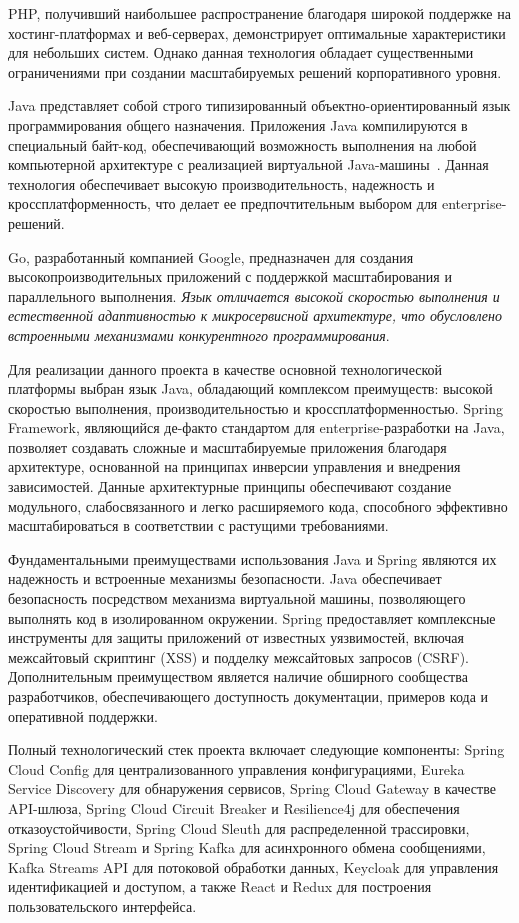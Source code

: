 PHP, получивший наибольшее распространение благодаря широкой поддержке на хостинг-платформах и веб-серверах, демонстрирует оптимальные характеристики для небольших систем. Однако данная технология обладает существенными ограничениями при создании масштабируемых решений корпоративного уровня.

Java представляет собой строго типизированный объектно-ориентированный язык программирования общего назначения.
Приложения Java компилируются в специальный байт-код, обеспечивающий возможность выполнения на любой компьютерной архитектуре с реализацией виртуальной Java-машины~\cite{12_schildt2019}. Данная технология обеспечивает высокую производительность, надежность и кроссплатформенность, что делает ее предпочтительным выбором для enterprise-решений.

Go, разработанный компанией Google, предназначен для создания высокопроизводительных приложений с поддержкой масштабирования и параллельного выполнения. \textit{Язык отличается высокой скоростью выполнения и естественной адаптивностью к микросервисной архитектуре, что обусловлено встроенными механизмами конкурентного программирования}.

Для реализации данного проекта в качестве основной технологической платформы выбран язык Java, обладающий комплексом преимуществ: высокой скоростью выполнения, производительностью и кроссплатформенностью.
Spring Framework, являющийся де-факто стандартом для enterprise-разработки на Java, позволяет создавать сложные и масштабируемые приложения благодаря архитектуре, основанной на принципах инверсии управления и внедрения зависимостей. Данные архитектурные принципы обеспечивают создание модульного, слабосвязанного и легко расширяемого кода, способного эффективно масштабироваться в соответствии с растущими требованиями.

Фундаментальными преимуществами использования Java и Spring являются их надежность и встроенные механизмы безопасности.
Java обеспечивает безопасность посредством механизма виртуальной машины, позволяющего выполнять код в изолированном окружении.
Spring предоставляет комплексные инструменты для защиты приложений от известных уязвимостей, включая межсайтовый скриптинг (XSS) и подделку межсайтовых запросов (CSRF). Дополнительным преимуществом является наличие обширного сообщества разработчиков, обеспечивающего доступность документации, примеров кода и оперативной поддержки.

Полный технологический стек проекта включает следующие компоненты: Spring Cloud Config для централизованного управления конфигурациями, Eureka Service Discovery для обнаружения сервисов, Spring Cloud Gateway в качестве API-шлюза, Spring Cloud Circuit Breaker и Resilience4j для обеспечения отказоустойчивости, Spring Cloud Sleuth для распределенной трассировки, Spring Cloud Stream и Spring Kafka для асинхронного обмена сообщениями, Kafka Streams API для потоковой обработки данных, Keycloak для управления идентификацией и доступом, а также React и Redux для построения пользовательского интерфейса.

